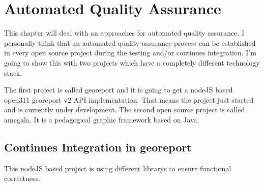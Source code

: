 \documentclass[DIV=calc,paper=a4,fontsize=9pt,twocolumn]{scrartcl}
\begin{document}
\section{Automated Quality Assurance\label{sec:automated-quality-assurance}}

This chapter will deal with an approaches for automated quality assurance. I personally think that an automated quality assurance process can be established in every open source project during the testing and/or continues integration. I'm going to show this with two projects which have a completely different technology stack. 

The first project is called georeport and it is going to get a nodeJS based open311 georeport v2 API implementation. That means the project just started and is currently under development. The second open source project is called amcgala. It is a pedagogical graphic framework based on Java.

\subsection{Continues Integration in georeport}

This nodeJS based project is using different librarys to ensure functional correctness.  


\end{document}
